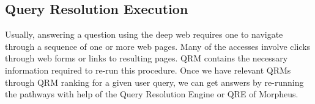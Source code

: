 \subsection{Query Resolution Execution} 

Usually, answering a question using the 
deep web requires one to navigate through a sequence of one or 
more web pages. Many of the accesses involve clicks through 
web forms or links to resulting pages. QRM contains the necessary  
information required to re-run this procedure. Once we have 
relevant QRMs through QRM ranking for a given user query, we can  
get answers by re-running the pathways with help of 
the Query Resolution Engine or QRE of Morpheus. 


  


